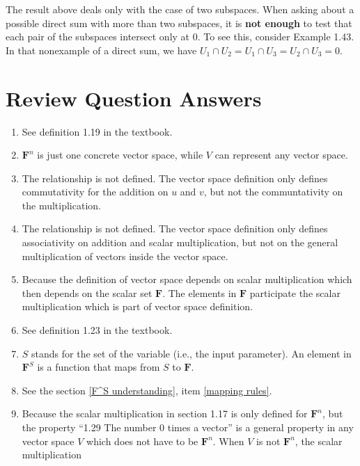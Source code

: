 \documentclass[12pt, letterpaper, oneside]{book}
\begin{document}
\begin{displayquote}
  The result above deals only with the case of two subspaces. When asking about
  a possible direct sum with more than two subspaces, it is \textbf{not enough}
  to test that each pair of the subspaces intersect only at 0. To see this,
  consider Example 1.43. In that nonexample of a direct sum, we have $U_1 \cap
  U_2 = U_1 \cap U_3 = U_2 \cap U_3 = {0}.$
\end{displayquote}

\section{Review Question Answers}

\begin{enumerate}
  \item See definition 1.19 in the textbook.
  \item $\mathbf{F}^n$ is just one concrete vector space, while $V$ can
    represent any vector space.
  \item The relationship is not defined. The vector space definition only
    defines commutativity for the addition on $u$ and $v$, but not the
    communtativity on the multiplication.
  \item The relationship is not defined. The vector space definition only
    defines associativity on addition and scalar multiplication, but not on
    the general multiplication of vectors inside the vector space.
  \item Because the definition of vector space depends on scalar multiplication
    which then depends on the scalar set $\mathbf{F}$. The elements in
    $\mathbf{F}$ participate the scalar multiplication which is part of vector
    space definition.
  \item See definition 1.23 in the textbook.
  \item $S$ stands for the set of the variable (i.e., the input parameter). An
    element in $\mathbf{F}^S$ is a function that maps from $S$ to $\mathbf{F}$.
  \item See the section \ref{F^S understanding}, item \ref{mapping rules}.
    \item Because the scalar multiplication in section 1.17 is only defined for
    $\mathbf{F}^n$, but the property ``1.29 The number 0 times a vector'' is a
    general property in any vector space $V$ which does not have to be
    $\mathbf{F}^n$. When $V$ is not $\mathbf{F}^n$, the scalar multiplication

\end{enumerate}
\end{document}
